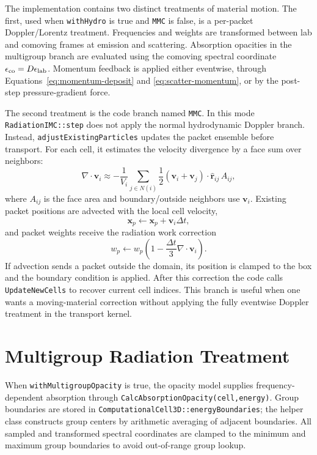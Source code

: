 \documentclass[11pt]{article}
\newcommand{\dt}{\Delta t}
\newcommand{\vcell}{\mathbf{v}}
\newcommand{\x}{\mathbf{x}}
\begin{document}
The implementation contains two distinct treatments of material motion. The
first, used when \texttt{withHydro} is true and \texttt{MMC} is false, is a
per-packet Doppler/Lorentz treatment. Frequencies and weights are transformed
between lab and comoving frames at emission and scattering. Absorption opacities
in the multigroup branch are evaluated using the comoving spectral coordinate
\(\epsilon_{\rm co}=D\epsilon_{\rm lab}\). Momentum feedback is applied either
eventwise, through Equations~\eqref{eq:momentum-deposit} and
\eqref{eq:scatter-momentum}, or by the post-step pressure-gradient force.

The second treatment is the code branch named \texttt{MMC}. In this mode
\texttt{RadiationIMC::step} does not apply the normal hydrodynamic Doppler
branch. Instead, \texttt{adjustExistingParticles} updates the packet ensemble
before transport. For each cell, it estimates the velocity divergence by a face
sum over neighbors:
\begin{equation}
  \nabla\cdot\vcell_i
  \approx
  -\frac{1}{V_i}
  \sum_{j\in N(i)}
  \frac{1}{2}
  (\vcell_i+\vcell_j)\cdot\hat{\mathbf{r}}_{ij}\,A_{ij},
  \label{eq:divv}
\end{equation}
where \(A_{ij}\) is the face area and boundary/outside neighbors use
\(\vcell_i\). Existing packet positions are advected with the local cell
velocity,
\begin{equation}
  \x_p \leftarrow \x_p+\vcell_i\dt,
\end{equation}
and packet weights receive the radiation work correction
\begin{equation}
  w_p \leftarrow w_p
  \left(1-\frac{\dt}{3}\nabla\cdot\vcell_i\right).
  \label{eq:mmc-weight}
\end{equation}
If advection sends a packet outside the domain, its position is clamped to the
box and the boundary condition is applied. After this correction the code calls
\texttt{UpdateNewCells} to recover current cell indices. This branch is useful
when one wants a moving-material correction without applying the fully
eventwise Doppler treatment in the transport kernel.

\section{Multigroup Radiation Treatment}

When \texttt{withMultigroupOpacity} is true, the opacity model supplies
frequency-dependent absorption through
\texttt{CalcAbsorptionOpacity(cell,energy)}. Group boundaries are stored in
\texttt{ComputationalCell3D::energyBoundaries}; the helper class constructs
group centers by arithmetic averaging of adjacent boundaries. All sampled and
transformed spectral coordinates are clamped to the minimum and maximum group
boundaries to avoid out-of-range group lookup.
\end{document}
